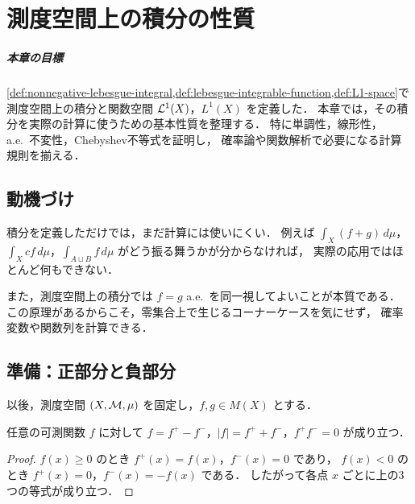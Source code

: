 \setcounter{chapter}{8}
\chapter{測度空間上の積分の性質}

\paragraph{本章の目標}
\cref{def:nonnegative-lebesgue-integral,def:lebesgue-integrable-function,def:L1-space}で
測度空間上の積分と関数空間 $\mathcal L^1(X)$，$L^1(X)$ を定義した．
本章では，その積分を実際の計算に使うための基本性質を整理する．
特に単調性，線形性，a.e.\ 不変性，Chebyshev不等式を証明し，
確率論や関数解析で必要になる計算規則を揃える．

\section{動機づけ}

積分を定義しただけでは，まだ計算には使いにくい．
例えば $\int_X(f+g)\,d\mu$，$\int_X cf\,d\mu$，$\int_{A\sqcup B}f\,d\mu$ がどう振る舞うかが分からなければ，
実際の応用ではほとんど何もできない．

また，測度空間上の積分では $f=g$ a.e.\ を同一視してよいことが本質である．
この原理があるからこそ，零集合上で生じるコーナーケースを気にせず，
確率変数や関数列を計算できる．

\section{準備：正部分と負部分}

以後，測度空間 $(X,\mathcal M,\mu)$ を固定し，$f,g\in M(X)$ とする．

\begin{proposition}[基本恒等式]\label{prop:positive-negative-basic-identities}
任意の可測関数 $f$ に対して
$f=f^+-f^-$，$|f|=f^++f^-$，$f^+f^-=0$ が成り立つ．
\end{proposition}
\begin{proof}
$f(x)\ge 0$ のとき $f^+(x)=f(x)$，$f^-(x)=0$ であり，
$f(x)<0$ のとき $f^+(x)=0$，$f^-(x)=-f(x)$ である．
したがって各点 $x$ ごとに上の3つの等式が成り立つ．
\end{proof}


